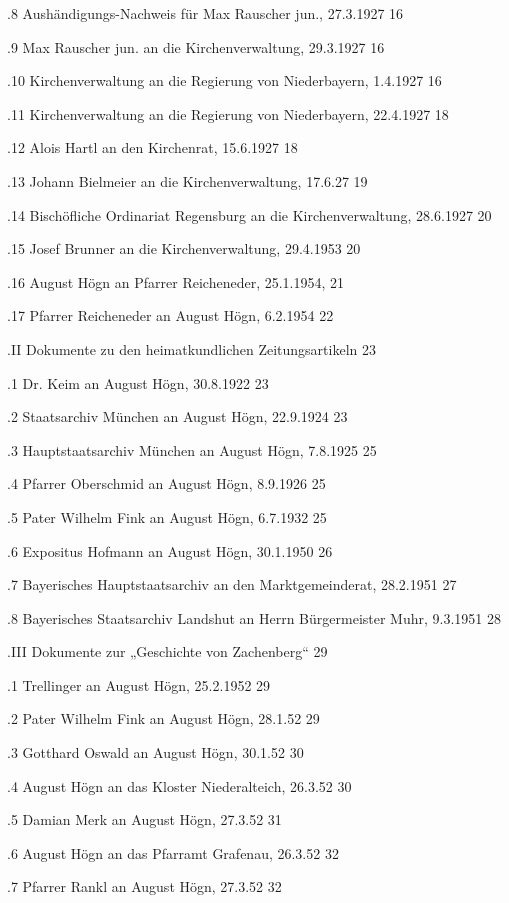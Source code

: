 .8 Aushändigungs-Nachweis für Max Rauscher jun., 27.3.1927  16

.9 Max Rauscher jun. an die Kirchenverwaltung, 29.3.1927    16

.10 Kirchenverwaltung an die Regierung von Niederbayern, 1.4.1927   16

.11 Kirchenverwaltung an die Regierung von Niederbayern, 22.4.1927  18

.12 Alois Hartl an den Kirchenrat, 15.6.1927    18

.13 Johann Bielmeier an die Kirchenverwaltung, 17.6.27  19

.14 Bischöfliche Ordinariat Regensburg an die Kirchenverwaltung, 28.6.1927  20

.15 Josef Brunner an die Kirchenverwaltung, 29.4.1953   20

.16 August Högn an Pfarrer Reicheneder, 25.1.1954,  21

.17 Pfarrer Reicheneder an August Högn, 6.2.1954    22

.II Dokumente zu den heimatkundlichen Zeitungsartikeln  23

.1 Dr. Keim an August Högn, 30.8.1922   23

.2 Staatsarchiv München an August Högn, 22.9.1924   23

.3 Hauptstaatsarchiv München an August Högn, 7.8.1925   25

.4 Pfarrer Oberschmid an August Högn, 8.9.1926  25

.5 Pater Wilhelm Fink an August Högn, 6.7.1932  25

.6 Expositus Hofmann an August Högn, 30.1.1950  26

.7 Bayerisches Hauptstaatsarchiv an den Marktgemeinderat, 28.2.1951     27

.8 Bayerisches Staatsarchiv Landshut an Herrn Bürgermeister Muhr, 9.3.1951  28

.III Dokumente zur „Geschichte von Zachenberg“  29

.1 Trellinger an August Högn, 25.2.1952 29

.2 Pater Wilhelm Fink an August Högn, 28.1.52   29

.3 Gotthard Oswald an August Högn, 30.1.52  30

.4 August Högn an das Kloster Niederalteich, 26.3.52    30

.5 Damian Merk an August Högn, 27.3.52  31

.6 August Högn an das Pfarramt Grafenau, 26.3.52    32

.7 Pfarrer Rankl an August Högn, 27.3.52    32

